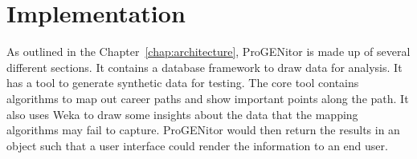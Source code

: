 \chapter{Implementation}
\label{chap:implementation}
As outlined in the Chapter~\ref{chap:architecture}, ProGENitor is made up of
several different sections.  It contains a database framework to draw data for
analysis.  It has a tool to generate synthetic data for testing.  The core tool
contains algorithms to map out career paths and show important points along the
path.  It also uses Weka to draw some insights about the data that the mapping
algorithms may fail to capture.  ProGENitor would then return the results in an
object such that a user interface could render the information to an end user.







